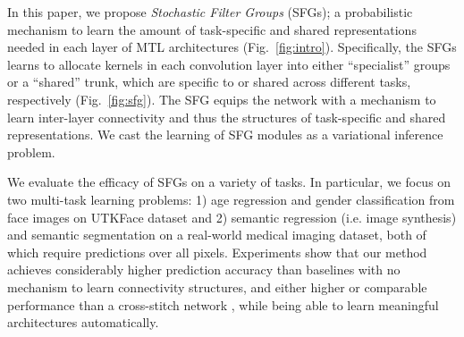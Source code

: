 

In this paper, we propose \textit{Stochastic Filter Groups} (SFGs); a probabilistic mechanism to learn the amount of task-specific and shared representations needed in each layer of MTL architectures (Fig.~\ref{fig:intro}). Specifically, the SFGs learns to allocate kernels in each convolution layer into either ``specialist'' groups or a ``shared'' trunk, which are specific to or shared across different tasks, respectively (Fig.~\ref{fig:sfg}). The SFG equips the network with a mechanism to learn inter-layer connectivity and thus the structures of task-specific and shared representations. We cast the learning of SFG modules as a variational inference problem.

We evaluate the efficacy of SFGs on a variety of tasks. In particular, we focus on two multi-task learning problems: 1) age regression and gender classification from face images on UTKFace dataset \cite{zhifei2017cvpr} and 2) semantic regression (i.e. image synthesis) and semantic segmentation on a real-world medical imaging dataset, both of which require predictions over all pixels. Experiments show that our method achieves considerably higher prediction accuracy than baselines with no mechanism to learn connectivity structures, and either higher or comparable performance than a cross-stitch network \cite{MisraCrossMTL16}, while being able to learn meaningful architectures automatically.



